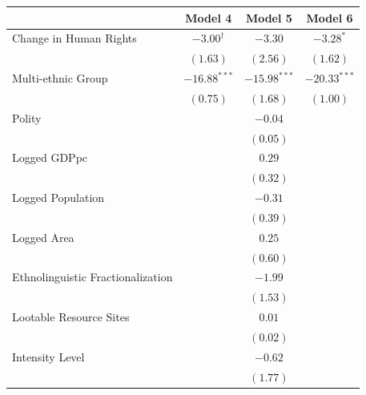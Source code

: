 \documentclass[12pt,]{book}
\let\origtable\table
\let\endorigtable\endtable
\renewenvironment{table}[1][2] {
    \singlespacing
    \expandafter\origtable\expandafter[H]
} {
    \endorigtable
}
\theoremstyle{definition}
\theoremstyle{definition}
\theoremstyle{definition}
\theoremstyle{remark}
\begin{document}
\begin{table}
\begin{center}
\begin{tabular}{l c c c }
\hline
 & Model 4 & Model 5 & Model 6 \\
\hline
Change in Human Rights            & $-3.00^{\dagger}$ & $-3.30$        & $-3.28^{*}$    \\
                                  & $(1.63)$          & $(2.56)$       & $(1.62)$       \\
Multi-ethnic Group                & $-16.88^{***}$    & $-15.98^{***}$ & $-20.33^{***}$ \\
                                  & $(0.75)$          & $(1.68)$       & $(1.00)$       \\
Polity                            &                   & $-0.04$        &                \\
                                  &                   & $(0.05)$       &                \\
Logged GDPpc                      &                   & $0.29$         &                \\
                                  &                   & $(0.32)$       &                \\
Logged Population                 &                   & $-0.31$        &                \\
                                  &                   & $(0.39)$       &                \\
Logged Area                       &                   & $0.25$         &                \\
                                  &                   & $(0.60)$       &                \\
Ethnolinguistic Fractionalization &                   & $-1.99$        &                \\
                                  &                   & $(1.53)$       &                \\
Lootable Resource Sites           &                   & $0.01$         &                \\
                                  &                   & $(0.02)$       &                \\
Intensity Level                   &                   & $-0.62$        &                \\
                                  &                   & $(1.77)$       &                \\

\end{tabular}
\end{center}
\end{table}
\end{document}
